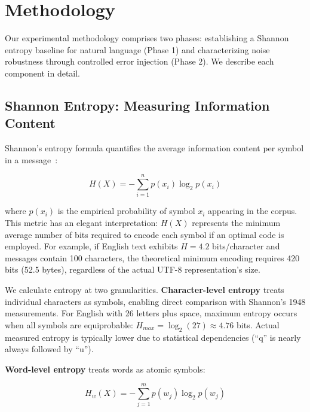 \documentclass[conference]{IEEEtran}
\begin{document}
\section{Methodology}

Our experimental methodology comprises two phases: establishing a Shannon 
entropy baseline for natural language (Phase 1) and characterizing noise 
robustness through controlled error injection (Phase 2). We describe 
each component in detail.

\subsection{Shannon Entropy: Measuring Information Content}

Shannon's entropy formula quantifies the average information content 
per symbol in a message~\cite{Shannon1948}:

\begin{equation}
H(X) = -\sum_{i=1}^{n} p(x_i) \log_2 p(x_i)
\label{eq:shannon}
\end{equation}

where $p(x_i)$ is the empirical probability of symbol $x_i$ appearing 
in the corpus. This metric has an elegant interpretation: $H(X)$ represents 
the minimum average number of bits required to encode each symbol if 
an optimal code is employed. For example, if English text exhibits 
$H = 4.2$ bits/character and messages contain 100 characters, the theoretical 
minimum encoding requires 420 bits (52.5 bytes), regardless of the actual 
UTF-8 representation's size.

We calculate entropy at two granularities. \textbf{Character-level entropy} 
treats individual characters as symbols, enabling direct comparison with 
Shannon's 1948 measurements. For English with 26 letters plus space, 
maximum entropy occurs when all symbols are equiprobable: $H_{max} = \log_2(27) \approx 4.76$ 
bits. Actual measured entropy is typically lower due to statistical 
dependencies (``q'' is nearly always followed by ``u'').

\textbf{Word-level entropy} treats words as atomic symbols:

\begin{equation}
H_w(X) = -\sum_{j=1}^{m} p(w_j) \log_2 p(w_j)
\label{eq:word_entropy}
\end{equation}
\end{document}

